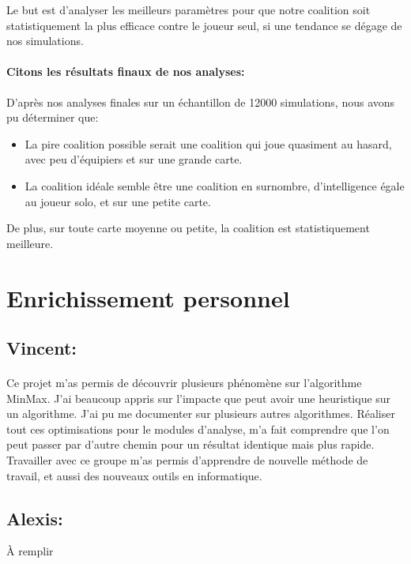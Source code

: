 \documentclass[
	headsepline=on,
	footsepline=on,
	twoside=off,
	abstract=on,
	DIV=10
]{scrreprt}
\begin{document}
			
			\begin{problem}
				Le but est d'analyser les meilleurs paramètres pour que notre coalition soit statistiquement la plus efficace contre le joueur seul, si une tendance se dégage de nos simulations.
			\end{problem}
			
			
			\paragraph{Citons les résultats finaux de nos analyses:}
			
			D'après nos analyses finales sur un échantillon de 12000 simulations, nous avons pu déterminer que:
			
			\begin{itemize}
				\item La pire coalition possible serait une coalition qui joue quasiment au hasard, avec peu d'équipiers et sur une grande carte.
				\item La coalition idéale semble être une coalition en surnombre, d'intelligence égale au joueur solo, et sur une petite carte.
			\end{itemize} 
			
			De plus, sur toute carte moyenne ou petite, la coalition est statistiquement meilleure. 
			
			
									
			\section{Enrichissement personnel}
				\subsection{Vincent: }
				\paragraph{}
				Ce projet m'as permis de découvrir plusieurs phénomène sur l'algorithme MinMax. 
				J'ai beaucoup appris sur l'impacte que peut avoir une heuristique sur un algorithme. 
				J'ai pu me documenter sur plusieurs autres algorithmes. Réaliser tout ces optimisations pour le modules d'analyse, m'a fait comprendre que l'on peut passer par d'autre chemin pour un résultat identique mais plus rapide.
				Travailler avec ce groupe m'as permis d'apprendre de nouvelle méthode de travail, et aussi des nouveaux outils en informatique.
				 
				\subsection{Alexis:} À remplir
				 
\end{document}
